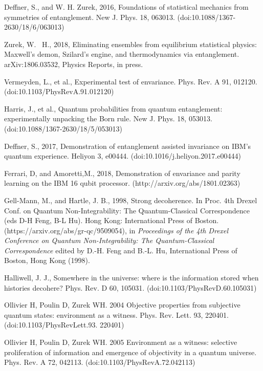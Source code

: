 \documentclass[aps,amsmath,amssymb,amsfonts,12pt]{revtex4-1}
\newcommand{\+}         {\dagger}
\begin{document}
{{{\begin{references}
 Deffner, S., and W. H. Zurek, 2016, Foundations of statistical mechanics from symmetries of
entanglement. New J. Phys. 18, 063013. (doi:10.1088/1367-2630/18/6/063013)

 Zurek, W. ~H., 2018, Eliminating ensembles from equilibrium statistical physics: Maxwell's
demon, Szilard's engine, and thermodynamics via entanglement. arXiv:1806.03532, Physics Reports, in press.

 Vermeyden, L., et al., 
Experimental
test of envariance. Phys. Rev. A 91, 012120. (doi:10.1103/PhysRevA.91.012120)

 Harris, J.,  et al., 
Quantum
probabilities from quantum entanglement: experimentally unpacking the Born rule. New J.
Phys. 18, 053013. (doi:10.1088/1367-2630/18/5/053013)

 Deffner, S., 2017, Demonstration of entanglement assisted invariance on IBM's quantum
experience. Heliyon 3, e00444. (doi:10.1016/j.heliyon.2017.e00444)

 Ferrari, D, and Amoretti,M., 2018, Demonstration of envariance and parity learning on the IBM 16
qubit processor. (http://arxiv.org/abs/1801.02363)

 Gell-Mann, M., and Hartle, J. B., 1998, Strong decoherence. In Proc. 4th Drexel Conf. on Quantum
Non-Integrability: The Quantum-Classical Correspondence (eds D-H Feng, B-L Hu). Hong Kong:
International Press of Boston. (https://arxiv.org/abs/gr-qc/9509054), in {\it Proceedings of the 4th Drexel Conference on Quantum Non-Integrability: The Quantum-Classical Correspondence} edited by D.-H. Feng and B.-L. Hu, International Press of Boston, Hong Kong (1998).

 Halliwell, J. J., Somewhere in the universe: where is the information stored when histories
decohere? Phys. Rev. D 60, 105031. (doi:10.1103/PhysRevD.60.105031)

 Ollivier H, Poulin D, Zurek WH. 2004 Objective properties from subjective quantum
states: environment as a witness. Phys. Rev. Lett. 93, 220401. (doi:10.1103/PhysRevLett.93.
220401)

 Ollivier H, Poulin D, Zurek WH. 2005 Environment as a witness: selective proliferation of
information and emergence of objectivity in a quantum universe. Phys. Rev. A 72, 042113.
(doi:10.1103/PhysRevA.72.042113)


\end{references}}}}
\end{document}
